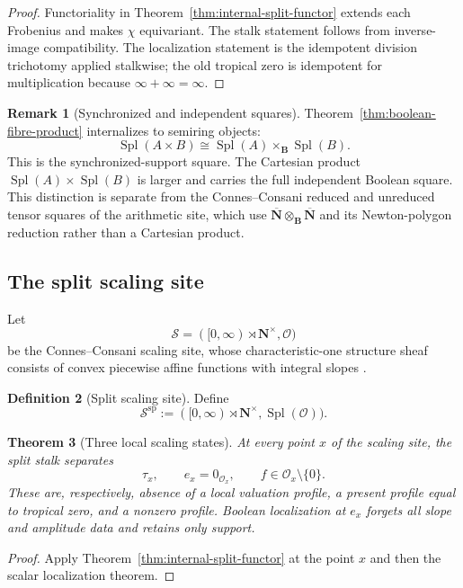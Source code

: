 \documentclass[11pt]{amsart}
\numberwithin{equation}{section}
\newtheorem{theorem}{Theorem}[section]
\theoremstyle{definition}
\newtheorem{definition}[theorem]{Definition}
\newtheorem{remark}[theorem]{Remark}
\newcommand{\B}{\mathbf B}
\newcommand{\N}{\mathbf N}
\newcommand{\cO}{\mathcal O}
\newcommand{\Spl}{\operatorname{Spl}}
\newcommand{\Nbar}{\overline{\N}}
\begin{document}
\begin{proof}
Functoriality in Theorem~\ref{thm:internal-split-functor} extends each
Frobenius and makes $\chi$ equivariant.  The stalk statement follows from
inverse-image compatibility.  The localization statement is the
idempotent division trichotomy applied stalkwise; the old tropical zero is
idempotent for multiplication because $\infty+\infty=\infty$.
\end{proof}

\begin{remark}[Synchronized and independent squares]
Theorem~\ref{thm:boolean-fibre-product} internalizes to semiring objects:
\[
\Spl(A\times B)\cong\Spl(A)\times_{\B}\Spl(B).
\]
This is the synchronized-support square.  The Cartesian product
$\Spl(A)\times\Spl(B)$ is larger and carries the full independent Boolean
square.  This distinction is separate from the Connes--Consani reduced and
unreduced tensor squares of the arithmetic site, which use
$\Nbar\otimes_{\B}\Nbar$ and its Newton-polygon reduction rather than a
Cartesian product.
\end{remark}

\subsection{The split scaling site}

Let
\[
\mathscr S=([0,\infty)\rtimes\N^\times,\cO)
\]
be the Connes--Consani scaling site, whose characteristic-one structure
sheaf consists of convex piecewise affine functions with integral slopes
\cite{CCScalingSite,CCAbsolute}.

\begin{definition}[Split scaling site]
\label{def:split-scaling-site}
Define
\[
\mathscr S^{\mathrm{sp}}
:=([0,\infty)\rtimes\N^\times,\Spl(\cO)).
\]
\end{definition}

\begin{theorem}[Three local scaling states]
\label{thm:three-scaling-states}
At every point $x$ of the scaling site, the split stalk separates
\[
\tau_x,
\qquad
e_x=0_{\cO_x},
\qquad
f\in\cO_x\setminus\{0\}.
\]
These are, respectively, absence of a local valuation profile, a present
profile equal to tropical zero, and a nonzero profile.  Boolean
localization at $e_x$ forgets all slope and amplitude data and retains only
support.
\end{theorem}

\begin{proof}
Apply Theorem~\ref{thm:internal-split-functor} at the point $x$ and then
the scalar localization theorem.
\end{proof}
\end{document}
